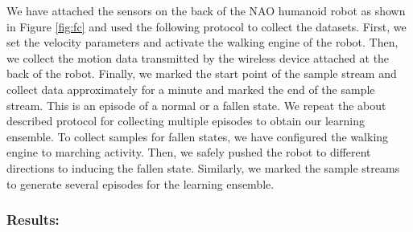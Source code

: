 \documentclass[letterpaper]{article}
\begin{document}
\begin{sloppy}
We have attached the sensors on the back of the NAO humanoid robot as shown in Figure \ref{fig:fc} 
and used the following protocol to collect the datasets. First, we set the velocity 
parameters and activate the walking engine of the robot. Then, we collect the motion data 
transmitted by the wireless device attached at the back of the robot. Finally, we marked the start 
point of the sample stream and collect data approximately for a minute and marked the end of the 
sample stream. This is an episode of a normal  or a fallen state. We repeat the about described 
protocol for collecting multiple episodes to obtain our learning ensemble. To collect samples for 
fallen states, we have configured the walking engine to marching activity. Then, we safely pushed 
the robot to different directions to inducing the fallen state. Similarly, we marked the sample 
streams to generate several episodes for the learning ensemble.    
%


\subsubsection{Results:}


\end{sloppy}
\end{document}
